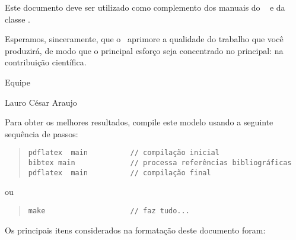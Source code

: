\documentclass[12pt,]{04-class-files/abntex2}
\begin{document}
Este documento deve ser utilizado como complemento dos manuais do \abnTeX~
\cite{abntex2classe,abntex2cite,abntex2cite-alf} e da classe \textcite{memoir}
\cite{memoir}.

Esperamos, sinceramente, que o \abnTeX~aprimore a qualidade do trabalho que
você produzirá, de modo que o principal esforço seja concentrado no principal:
na contribuição científica.

Equipe \abnTeX 

Lauro César Araujo

Para obter os melhores resultados, compile este modelo usando a seguinte sequência de passos:

\begin{quote}
\begin{footnotesize}
\begin{verbatim}
pdflatex  main          // compilação inicial
bibtex main             // processa referências bibliográficas
pdflatex  main          // compilação final
\end{verbatim}
\end{footnotesize}
\end{quote}

ou

\begin{quote}
\begin{footnotesize}
\begin{verbatim}
make                    // faz tudo...
\end{verbatim}
\end{footnotesize}
\end{quote}

Os principais itens considerados na formatação deste documento foram:
\end{document}
